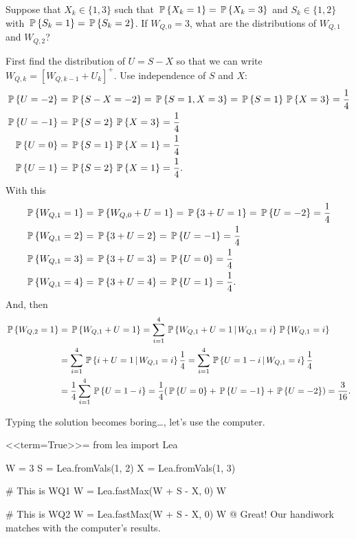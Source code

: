 \begin{question}
  Suppose that $X_k\in\{1,3\}$ such that $\P{X_k=1}=\P{X_k=3}$ and
  $S_k\in\{1,2\}$ with $\P{S_k=1}=\P{S_k=2}$. If $W_{Q,0}=3$, what are
  the distributions of $W_{Q,1}$ and $W_{Q,2}$?  

\begin{solution}  First find the distribution of $U=S-X$ so that we can write
  $W_{Q,k}=[W_{Q,k-1}+U_k]^+$.  Use independence of $S$ and $X$:
\begin{align*}
  \P{U=-2} &=\P{S-X=-2} = \P{S=1, X=3} = \P{S=1}\P{X=3} = \frac14\\
  \P{U=-1} &=\P{S=2}\P{X=3} = \frac14\\
  \P{U=0} &=\P{S=1}\P{X=1} = \frac14\\
  \P{U=1} &=\P{S=2}\P{X=1} = \frac14.
\end{align*}
With this
  \begin{align*}
    \P{W_{Q,1} = 1} &=\P{W_{Q,0} + U = 1} = \P{3 + U =1} = \P{U=-2} =\frac14\\
    \P{W_{Q,1} = 2} &= \P{3 + U =2} = \P{U=-1}  =\frac14\\
    \P{W_{Q,1} = 3} &= \P{3 + U = 3} = \P{U=0}  =\frac14\\
    \P{W_{Q,1} = 4} &= \P{3 + U = 4} = \P{U=1}  =\frac14.\\
  \end{align*}
And, then
  \begin{equation*}
    \begin{split}
    \P{W_{Q,2} = 1} 
&=\P{W_{Q,1} + U = 1} = \sum_{i=1}^4 \P{W_{Q,1} + U = 1\given W_{Q,1}=i}\P{W_{Q,1}=i}\\
&=\sum_{i=1}^4 \P{i + U = 1\given W_{Q,1}=i}\frac14
=\sum_{i=1}^4 \P{U = 1-i\given W_{Q,1}=i}\frac14\\
&=\frac14\sum_{i=1}^4 \P{U = 1-i} = \frac14(\P{U = 0} + \P{U=-1} +\P{U=-2}) = \frac{3}{16}.
    \end{split}
  \end{equation*}

Typing the solution becomes  boring\ldots, let's use the computer.

<<term=True>>=
from lea import Lea

W = 3
S = Lea.fromVals(1,  2)
X = Lea.fromVals(1,  3)

# This is WQ1
W = Lea.fastMax(W + S - X, 0)
W


# This is WQ2
W = Lea.fastMax(W + S - X, 0)
W
@
Great! Our handiwork matches with the computer's results. 

\end{solution}
\end{question}

